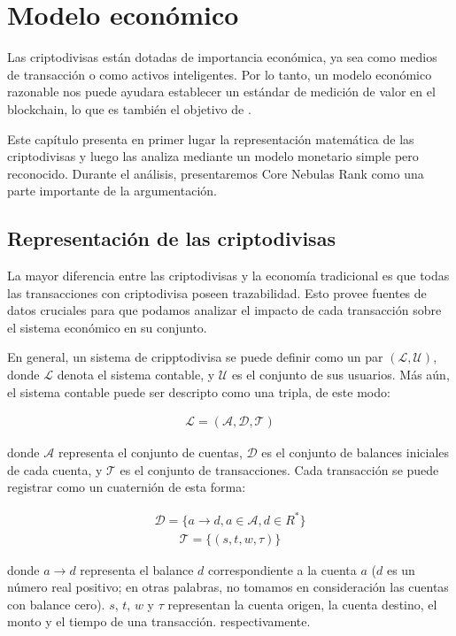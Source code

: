 \section{Modelo económico}
Las criptodivisas están dotadas de importancia económica, ya sea como medios de transacción o como activos inteligentes. Por lo tanto, un modelo económico razonable nos puede ayudara establecer un estándar de medición de valor en el blockchain, lo que es también el objetivo de \nrcore.

Este capítulo presenta en primer lugar la representación matemática de las criptodivisas y luego las analiza mediante un modelo monetario simple pero reconocido. Durante el análisis, presentaremos Core Nebulas Rank como una parte importante de la argumentación.

\subsection{Representación de las criptodivisas}
La mayor diferencia entre las criptodivisas y la economía tradicional es que todas las transacciones con criptodivisa poseen trazabilidad. Esto provee fuentes de datos cruciales para que podamos analizar el impacto de cada transacción sobre el sistema económico en su conjunto.

En general, un sistema de cripptodivisa se puede definir como un par $(\mathcal{L}, \mathcal{U})$, donde $\mathcal{L}$ denota el sistema contable, y $\mathcal{U}$ es el conjunto de sus usuarios. Más aún, el sistema contable puede ser descripto como una tripla, de este modo:

\begin{align}
\mathcal{L} = (\mathcal{A}, \mathcal{D}, \mathcal{T})
\end{align}

\noindent donde $\mathcal{A}$ representa el conjunto de cuentas, $\mathcal{D}$ es el conjunto de balances iniciales de cada cuenta, y $\mathcal{T}$ es el conjunto de transacciones. Cada transacción se puede registrar como un cuaternión de esta forma:

\begin{align}
\mathcal{D} = \{a \rightarrow d, a{\in}\mathcal{A}, d{\in}R^*\}
\end{align}
\begin{align}
\mathcal{T} = \{(s, t, w, \tau)\}
\end{align}

\noindent donde $a \rightarrow d$ representa el balance $d$ correspondiente a la cuenta $a$ ($d$ es un número real positivo; en otras palabras, no tomamos en consideración las cuentas con balance cero). $s$, $t$, $w$ y $\tau$ representan la cuenta origen, la cuenta destino, el monto y el tiempo de una transacción. respectivamente.

